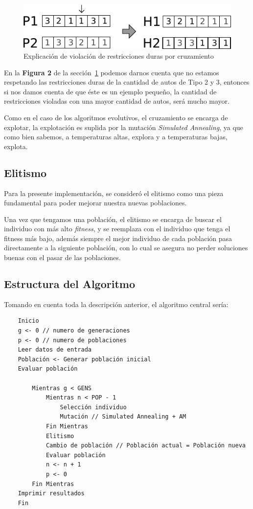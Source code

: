 \begin{figure}[htb!]
	\begin{center}
	\includegraphics[scale=1]{img/fig2}
	\end{center}
	\label{fig:fig2}
	\caption{Explicación de violación de restricciones duras por cruzamiento}
\end{figure}

En la \textbf{Figura 2} de la sección~\ref{fig:fig2} podemos darnos cuenta que no estamos respetando las restricciones
duras de la cantidad de autos de Tipo 2 y 3, entonces si nos damos cuenta de que éste es un ejemplo
pequeño, la cantidad de restricciones violadas con una mayor cantidad de autos, será mucho mayor.

Como en el caso de los algoritmos evolutivos, el cruzamiento se encarga de explotar,
la explotación es suplida por la mutación \emph{Simulated Annealing}, ya que como bien sabemos,
a temperaturas altas, explora y a temperaturas bajas, explota.

\subsection{Elitismo}

Para la presente implementación, se consideró el elitismo como una pieza fundamental para poder
mejorar nuestra nuevas poblaciones.

Una vez que tengamos una población, el elitismo se encarga de buscar el individuo con más alto \emph{fitness},
y se reemplaza con el individuo que tenga el fitness más bajo, además siempre el mejor individuo de cada población
pasa directamente a la siguiente población, con lo cual se asegura no perder soluciones buenas con el pasar
de las poblaciones.

\subsection{Estructura del Algoritmo}

Tomando en cuenta toda la descripción anterior,
el algoritmo central sería:

\begin{verbatim}
	Inicio
	g <- 0 // numero de generaciones
	p <- 0 // numero de poblaciones
	Leer datos de entrada
    Población <- Generar población inicial
    Evaluar población

	    Mientras g < GENS
			Mientras n < POP - 1
				Selección individuo
				Mutación // Simulated Annealing + AM 
			Fin Mientras
			Elitismo
			Cambio de población // Población actual = Población nueva
			Evaluar población
	        n <- n + 1
	        p <- 0
		Fin Mientras
	Imprimir resultados
	Fin
\end{verbatim}

